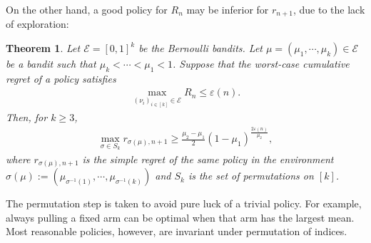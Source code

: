 \documentclass[letterpaper,10pt,openright,openany]{book}
\numberwithin{equation}{section}
\theoremstyle{plain}
\newtheorem{Th}{Theorem}[section]
\theoremstyle{definition}
\def\e{{\varepsilon}}
\begin{document}
On the other hand, a good policy for $R_n$ may be inferior for $r_{n+1}$, due to the lack of exploration:

\begin{Th}\label{bb:LB}
Let $\mathcal E=[0,1]^k$ be the Bernoulli bandits. Let $\mu = (\mu_1, \cdots, \mu_k)\in\mathcal E$ be a bandit such that $\mu_k<\cdots<\mu_1<1$. Suppose that the worst-case cumulative regret of a policy satisfies 
\begin{align}
\max_{(\nu_i)_{i\in [k]}\in\mathcal E}R_n\leq\e(n). \label{bb:1}
\end{align}
Then, for $k\geq 3$,
\begin{align*}
\max_{\sigma\in S_k}r_{\sigma(\mu), n+1}\geq\frac{\mu_2-\mu_1}{2}(1-\mu_1)^{\frac{2\e(n)}{\mu_2}},
\end{align*}
where $r_{\sigma(\mu), n+1}$ is the simple regret of the same policy in the environment $\sigma(\mu):=(\mu_{\sigma^{-1}(1)}, \cdots, \mu_{\sigma^{-1}(k)})$ and $S_k$ is the set of permutations on $[k]$.  
\end{Th}
The permutation step is taken to avoid pure luck of a trivial policy. For example, always pulling a fixed arm can be optimal when that arm has the largest mean. Most reasonable policies, however, are invariant under permutation of indices. 
\end{document}
